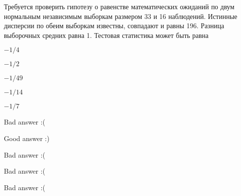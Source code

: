 
\begin{question}
Требуется проверить гипотезу о равенстве математических ожиданий по двум
нормальным независимым выборкам размером 33 и 16 наблюдений. Истинные
дисперсии по обеим выборкам известны, совпадают и равны 196. Разница
выборочных средних равна 1. Тестовая статистика может быть равна
\begin{answerlist}
  \item \(-1/4\)
  \item \(-1/2\)
  \item \(-1/49\)
  \item \(-1/14\)
  \item \(-1/7\)
\end{answerlist}
\end{question}

\begin{solution}
\begin{answerlist}
  \item Bad answer :(
  \item Good answer :)
  \item Bad answer :(
  \item Bad answer :(
  \item Bad answer :(
\end{answerlist}
\end{solution}

